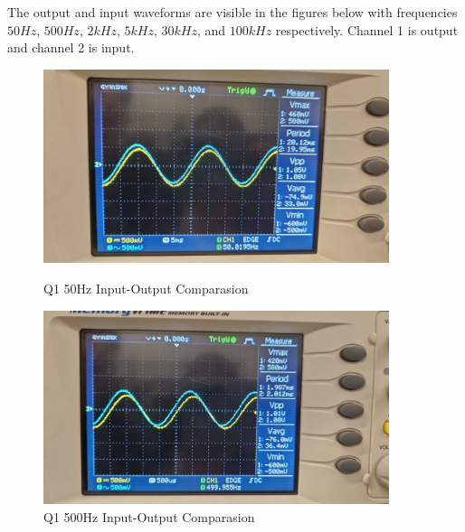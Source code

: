 The output and input waveforms are visible in the figures below with frequencies $50Hz$, $500Hz$, $2kHz$, $5kHz$, $30kHz$, and $100kHz$ respectively. Channel 1 is output and channel 2 is input.

\begin{figure}[h]
    \centering
    \begin{minipage}{0.5\textwidth}
        \includegraphics[width=0.9\textwidth , height=0.2\textheight]{assets/exp/q1-50Hz-1vpp-comp.jpeg}
        \caption{Q1 50Hz Input-Output Comparasion}
        \label{fig:q1-50Hz-1vpp-comp}
    \end{minipage}%
    \begin{minipage}{0.5\textwidth}
        \includegraphics[width=0.9\textwidth , height=0.2\textheight]{assets/exp/q1-500Hz-1vpp-comp.jpeg}
        \caption{Q1 500Hz Input-Output Comparasion}
        \label{fig:q1-500Hz-1vpp-comp}
    \end{minipage}
\end{figure}

\newpage
\thispagestyle{plain}


